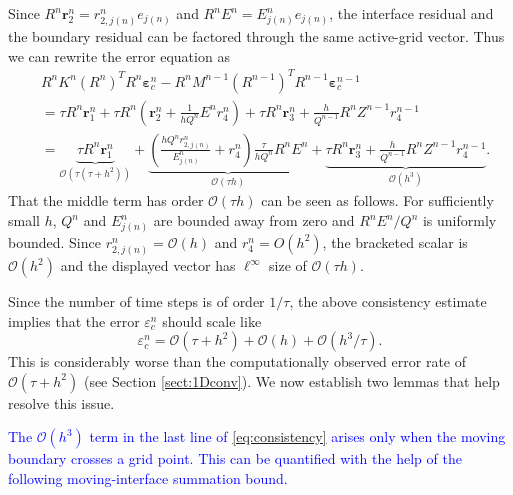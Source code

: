 \documentclass[11pt,reqno]{amsart}
\theoremstyle{plain}
\theoremstyle{definition}
\numberwithin{equation}{section}
\newcommand{\paren}[1]{\left(#1\right)}
\newcommand{\mc}[1]{\mathcal{#1}}
\newcommand{\bm}[1]{\boldsymbol{#1}}
\begin{document}
Since $R^n\bm r_2^n=r_{2,j(n)}^n e_{j(n)}$ and $R^nE^n=E_{j(n)}^n e_{j(n)}$, the interface residual and the boundary residual can be factored through the same active-grid vector. Thus we can rewrite the error equation as
\begin{equation}\label{eq:consistency}
\begin{aligned}
    & R^n K^n (R^n)^T R^n \bm\varepsilon_c^n - R^n M^{n-1}  (R^{n-1})^T R^{n-1} \bm \varepsilon_c^{n-1}     \\
    &= \tau R^n \bm r_1^n + \tau R^n\paren{ \bm r_2^n+ \frac{1}{h Q^n} E^n  r_4^n} + \tau R^n \bm r_3^n  +  \frac{h}{Q^{n-1}} R^n Z^{n-1} r_4^{n-1} \\
     &= \underbrace{\tau R^n \bm r_1^n}_{\mc O(\tau\paren{\tau+h^2})} + \underbrace{\paren{\frac{h Q^n  r_{2,j(n)}^n}{E_{j(n)}^n} + r_4^n} \frac{ \tau}{h Q^n}R^nE^n}_{\mc O(\tau h)} + \underbrace{\tau R^n \bm r_3^n  +  \frac{h}{Q^{n-1}} R^n Z^{n-1} r_4^{n-1}}_{\mc O(h^3)}.
\end{aligned}
\end{equation}
That the middle term has order $\mc{O}(\tau h)$ can be seen as follows. For sufficiently small $h$, $Q^n$ and $E_{j(n)}^n$ are bounded away from zero and $R^nE^n/Q^n$ is uniformly bounded. Since $r_{2,j(n)}^n=\mc{O}(h)$ and $r_4^n=O(h^2)$, the bracketed scalar is $\mc{O}(h^2)$ and the displayed vector has $\ell^\infty$ size of $\mc{O}(\tau h)$. %

Since the number of time steps is of order $1/\tau$, the above consistency estimate implies that the error $\varepsilon_c^n$ should scale like
\begin{equation}
\varepsilon_c^n =\mc{O}(\tau+h^2)+\mc{O}(h)+\mc{O}(h^3/\tau).
\end{equation}
This is considerably worse than the computationally observed error rate of $\mc{O}(\tau+h^2)$ (see Section \ref{sect:1Dconv}). We now establish two lemmas that help resolve this issue. 

\textcolor{blue}{The $\mc{O}(h^3)$ term in the last line of} \eqref{eq:consistency}
\textcolor{blue}{arises only when the moving boundary crosses a grid point. This can be quantified with the help of the following moving-interface summation bound.}
\end{document}

